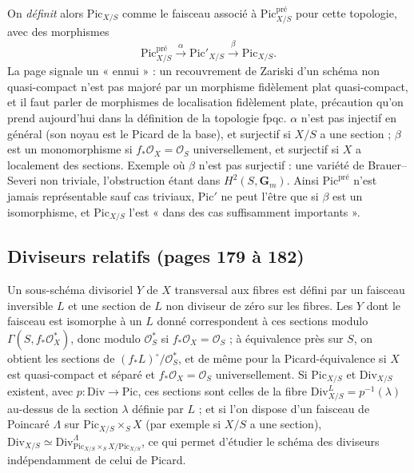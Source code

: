 \documentclass[11pt,a4paper]{article}
\begin{document}
On \emph{définit} alors $\mathrm{Pic}_{X/S}$ comme le faisceau associé à
$\mathrm{Pic}^{\mathrm{pré}}_{X/S}$ pour cette topologie, avec des morphismes
\[
\mathrm{Pic}^{\mathrm{pré}}_{X/S} \xrightarrow{\ \alpha\ } \mathrm{Pic}'_{X/S} \xrightarrow{\ \beta\ } \mathrm{Pic}_{X/S} .
\]
La page signale un « ennui » : un recouvrement de Zariski d'un schéma non
quasi-compact n'est pas majoré par un morphisme fidèlement plat
quasi-compact, et il faut parler de morphismes de localisation fidèlement
plate, précaution qu'on prend aujourd'hui dans la définition de la
topologie fpqc. $\alpha$ n'est pas injectif en général (son noyau est le
Picard de la base), et surjectif si $X/S$ a une section ; $\beta$ est un
monomorphisme si $f_*\mathcal{O}_X = \mathcal{O}_S$ universellement, et
surjectif si $X$ a localement des sections. Exemple où $\beta$ n'est pas
surjectif : une variété de Brauer--Severi non triviale, l'obstruction étant
dans $H^2(S, \mathbf{G}_m)$. Ainsi $\mathrm{Pic}^{\mathrm{pré}}$ n'est jamais
représentable sauf cas triviaux, $\mathrm{Pic}'$ ne peut l'être que si $\beta$
est un isomorphisme, et $\mathrm{Pic}_{X/S}$ l'est « dans des cas suffisamment
importants ».

\subsection*{Diviseurs relatifs (pages 179 à 182)}

Un sous-schéma divisoriel $Y$ de $X$ transversal aux fibres est défini par un
faisceau inversible $L$ et une section de $L$ non diviseur de zéro sur les
fibres. Les $Y$ dont le faisceau est isomorphe à un $L$ donné correspondent à
ces sections modulo $\Gamma(S, f_*\mathcal{O}^*_X)$, donc modulo
$\mathcal{O}^*_S$ si $f_*\mathcal{O}_X = \mathcal{O}_S$ ; à équivalence près
sur $S$, on obtient les sections de $(f_*L)^\circ/\mathcal{O}^*_S$, et de même
pour la Picard-équivalence si $X$ est quasi-compact et séparé et
$f_*\mathcal{O}_X = \mathcal{O}_S$ universellement. Si $\mathrm{Pic}_{X/S}$ et
$\mathrm{Div}_{X/S}$ existent, avec $p \colon \mathrm{Div} \to \mathrm{Pic}$,
ces sections sont celles de la fibre $\mathrm{Div}^L_{X/S} = p^{-1}(\lambda)$
au-dessus de la section $\lambda$ définie par $L$ ; et si l'on dispose d'un
faisceau de Poincaré $\Lambda$ sur $\mathrm{Pic}_{X/S} \times_S X$ (par exemple
si $X/S$ a une section),
$\mathrm{Div}_{X/S} \simeq \mathrm{Div}^{\Lambda}_{\mathrm{Pic}_{X/S} \times_S X / \mathrm{Pic}_{X/S}}$,
ce qui permet d'étudier le schéma des diviseurs indépendamment de celui de
Picard.
\end{document}
